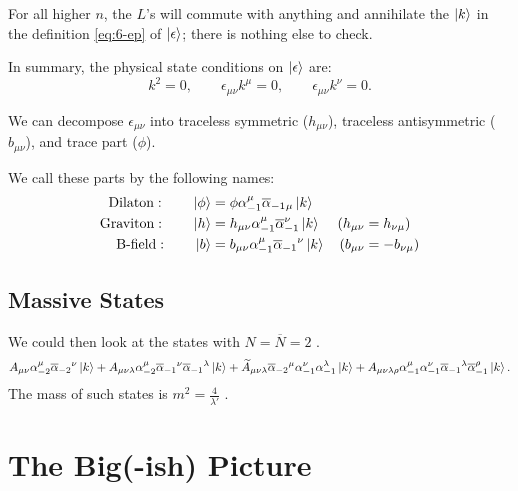 For all higher $n$, the $L$'s will commute with anything and annihilate the $\ket{k}$ in the definition \eqref{eq:6-ep} of $\ket{\epsilon}$; there is nothing else to check.

In summary, the physical state conditions on $\ket{\epsilon}$ are:
\begin{equation}
  k^2 = 0, \qquad \epsilon_{\mu\nu} k^{\mu} = 0, \qquad \epsilon_{\mu\nu} k^{\nu} = 0.
\end{equation}

We can decompose $\epsilon_{\mu\nu}$ into traceless symmetric ($h_{\mu\nu}$), traceless antisymmetric ($b_{\mu\nu}$), and trace part ($\phi$).

We call these parts by the following names:
\begin{align}
  \text{Dilaton}: \qquad \ket{\phi} &= \phi \alpha_{-1}^{\mu} \overline{\alpha}_{-1}{}_{\mu} \ket{k} && \\
  \text{Graviton}: \qquad \ket{h} &= h_{\mu\nu} \alpha_{-1}^{\mu} \overline{\alpha}_{-1}^{\nu} \ket{k} & (h_{\mu\nu} &= h_{\nu\mu}) \\
  \text{B-field}: \qquad \ket{b} &= b_{\mu\nu} \alpha_{-1}^{\mu} \overline{\alpha}_{-1}{}^{\nu} \ket{k} & (b_{\mu\nu} &= -b_{\nu\mu})
\end{align}

\subsection{Massive States}%
\label{sub:massive_states}

We could then look at the states with $N = \overline{N} = 2$ .
\begin{equation}
  A_{\mu\nu} \alpha^{\mu}_{-2} \overline{\alpha}_{-2}{}^{\nu} \ket{k} + A_{\mu\nu\lambda} \alpha_{-2}^{\mu} \overline{\alpha}_{-1}{}^{\nu} \overline{\alpha}_{-1}{}^{\lambda} \ket{k}
  + \widetilde{A}_{\mu\nu\lambda} \overline{\alpha}_{-2}{}^{\mu} \alpha^{\nu}_{-1} \alpha^{\lambda}_{-1} \ket{k}
  + A_{\mu\nu\lambda\rho} \alpha^{\mu}_{-1} \alpha^{\nu}_{-1} \overline{\alpha}_{-1}{}^{\lambda} \overline{\alpha}{}^{\rho}_{-1} \ket{k}.
\end{equation}
The mass of such states is $m^2 = \frac{4}{\lambda'}$ .

\section{The Big(-ish) Picture}%
\label{sec:the_big_ish_picture}

